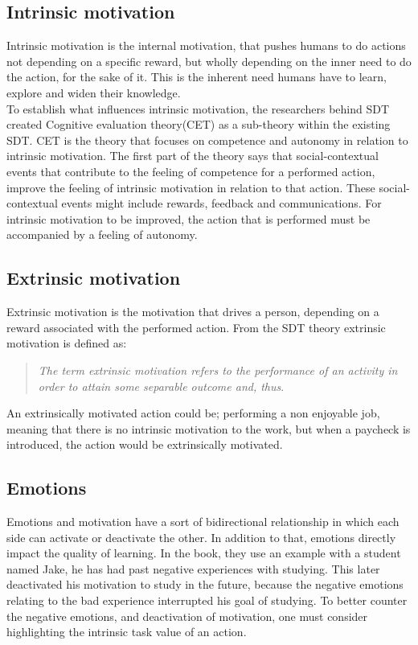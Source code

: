 \subsection*{Intrinsic motivation}
Intrinsic motivation is the internal motivation, that pushes humans to do actions not depending on a specific reward, but wholly depending on the inner need to do the action, for the sake of it\cite{SDT}.
This is the inherent need humans have to learn, explore and widen their knowledge\cite{SDT}.\\

To establish what influences intrinsic motivation, the researchers behind SDT\cite{SDT} created Cognitive evaluation theory(CET) as a sub-theory within the existing SDT. CET is the theory that focuses on competence and autonomy in relation to intrinsic motivation. The first part of the theory says that social-contextual events that contribute to the feeling of competence for a performed action, improve the feeling of intrinsic motivation in relation to that action\cite[p.~70]{SDT}. These social-contextual events might include rewards, feedback and communications\cite[p.~70]{SDT}. For intrinsic motivation to be improved, the action that is performed must be accompanied by a feeling of autonomy\cite[p.~70]{SDT}.

\subsection*{Extrinsic motivation}
Extrinsic motivation is the motivation that drives a person, depending on a reward associated with the performed action. From the SDT theory extrinsic motivation is defined as: 
\begin{quote}
	\textit{The term extrinsic motivation refers to the performance of an activity in order to attain some separable outcome and, thus}\cite[p.~71]{SDT}.\\
\end{quote}
An extrinsically motivated action could be; performing a non enjoyable job, meaning that there is no intrinsic motivation to the work, but when a paycheck is introduced, the action would be extrinsically motivated.

\subsection*{Emotions}
Emotions and motivation have a sort of bidirectional relationship in which each side can activate or deactivate the other\cite[pp.~66]{emotionsAndMotivation}. In addition to that, emotions directly impact the quality of learning\cite[pp.~66]{emotionsAndMotivation}. In the book\cite{emotionsAndMotivation}, they use an example with a student named Jake, he has had past negative experiences with studying. This later deactivated his motivation to study in the future, because the negative emotions relating to the bad experience interrupted his goal of studying\cite[pp.~67]{emotionsAndMotivation}. To better counter the negative emotions, and deactivation of motivation, one must consider highlighting the intrinsic task value of an action\cite[pp.68]{emotionsAndMotivation}.

